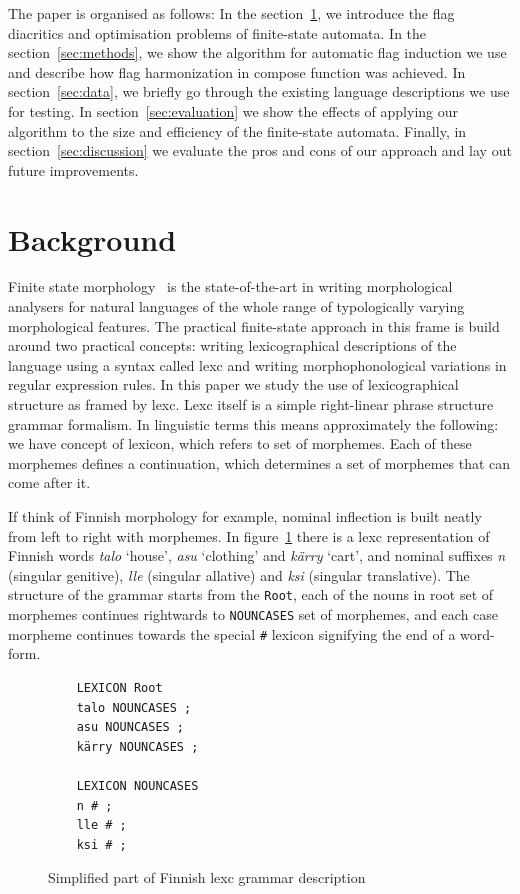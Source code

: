 \documentclass[11pt]{article}
\begin{document}
The paper is organised as follows: In the section~\ref{sec:background}, we
introduce the flag diacritics and optimisation problems of finite-state 
automata. In the section~\ref{sec:methods}, we show the algorithm for automatic
flag induction we use and describe how flag harmonization in compose function was achieved. 
In section~\ref{sec:data}, we briefly go through the existing language
descriptions we use for testing. In 
section~\ref{sec:evaluation} we show the effects of applying our algorithm
to the size and efficiency of the finite-state automata. Finally, in section~\ref{sec:discussion}
we evaluate the pros and cons of our approach and lay out future improvements.

\section{Background}
\label{sec:background}

Finite state morphology~\cite{beesley2003finite} is the state-of-the-art in
writing morphological analysers for natural languages of the whole range of
typologically varying morphological features. The practical finite-state
approach in this frame is build around two practical concepts: writing
lexicographical descriptions of the language using a syntax called lexc and
writing morphophonological variations in regular expression rules. In this
paper we study the use of lexicographical structure as framed by lexc. Lexc
itself is a simple right-linear phrase structure grammar formalism. In
linguistic terms this means approximately the following: we have concept of
lexicon, which refers to set of morphemes. Each of these morphemes defines a
continuation, which determines a set of morphemes that can come after it.

If think of Finnish morphology for example, nominal inflection is built neatly
from left to right with morphemes. In figure~\ref{fig:lexc-fin} there is a 
lexc representation of Finnish words \emph{talo} `house', \emph{asu}
`clothing' and \emph{kärry} `cart', and nominal suffixes \emph{n} (singular genitive),
\emph{lle} (singular allative) and \emph{ksi} (singular translative). The
structure of the grammar starts from the \texttt{Root}, each of the nouns in
root set of morphemes continues rightwards to \texttt{NOUNCASES} set of 
morphemes, and each case morpheme continues towards the special \texttt{\#}
lexicon signifying the end of a word-form.

\begin{figure}
    \centering
    \begin{verbatim}
    LEXICON Root
    talo NOUNCASES ;
    asu NOUNCASES ;
    kärry NOUNCASES ;

    LEXICON NOUNCASES
    n # ;
    lle # ;
    ksi # ;
    \end{verbatim}
    \caption{Simplified part of Finnish lexc grammar description
    \label{fig:lexc-fin}}
\end{figure}
\end{document}
